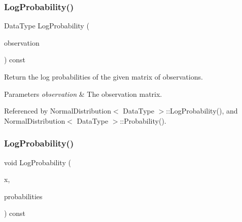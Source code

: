 \mbox{\label{classmlpack_1_1ann_1_1NormalDistribution_aa02bcee8ddd2603eac9ba925d709fe6e}} 
\subsubsection{Log\+Probability()\hspace{0.1cm}{\footnotesize\ttfamily [1/2]}}
{\footnotesize\ttfamily Data\+Type Log\+Probability (\begin{DoxyParamCaption}\item[{const Data\+Type \&}]{observation }\end{DoxyParamCaption}) const}



Return the log probabilities of the given matrix of observations. 


\begin{DoxyParams}{Parameters}
{\em observation} & The observation matrix. \\
\hline
\end{DoxyParams}


Referenced by Normal\+Distribution$<$ Data\+Type $>$\+::\+Log\+Probability(), and Normal\+Distribution$<$ Data\+Type $>$\+::\+Probability().

\mbox{\label{classmlpack_1_1ann_1_1NormalDistribution_a206f15b7f10ba5118df1bd6ac31ddf91}} 
\subsubsection{Log\+Probability()\hspace{0.1cm}{\footnotesize\ttfamily [2/2]}}
{\footnotesize\ttfamily void Log\+Probability (\begin{DoxyParamCaption}\item[{const Data\+Type \&}]{x,  }\item[{Data\+Type \&}]{probabilities }\end{DoxyParamCaption}) const\hspace{0.3cm}{\ttfamily [inline]}}



